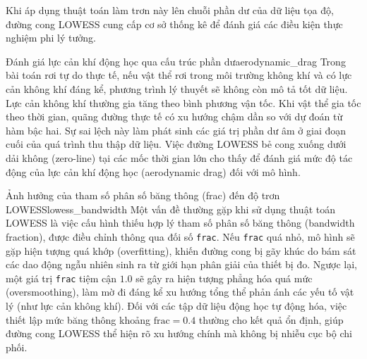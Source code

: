 Khi áp dụng thuật toán làm trơn này lên chuỗi phần dư của dữ liệu tọa độ, đường cong LOWESS cung cấp cơ sở thống kê để đánh giá các điều kiện thực nghiệm phi lý tưởng.

\begin{physcore}{Đánh giá lực cản khí động học qua cấu trúc phần dư}{aerodynamic_drag}
Trong bài toán rơi tự do thực tế, nếu vật thể rơi trong môi trường không khí và có lực cản không khí đáng kể, phương trình lý thuyết sẽ không còn mô tả tốt dữ liệu. Lực cản không khí thường gia tăng theo bình phương vận tốc. Khi vật thể gia tốc theo thời gian, quãng đường thực tế có xu hướng chậm dần so với dự đoán từ hàm bậc hai. Sự sai lệch này làm phát sinh các giá trị phần dư âm ở giai đoạn cuối của quá trình thu thập dữ liệu. Việc đường LOWESS bẻ cong xuống dưới dải không (zero-line) tại các mốc thời gian lớn cho thấy để đánh giá mức độ tác động của lực cản khí động học (aerodynamic drag) đối với mô hình.
\end{physcore}

\begin{pitfall}{Ảnh hưởng của tham số phân số băng thông (frac) đến độ trơn LOWESS}{lowess_bandwidth}
Một vấn đề thường gặp khi sử dụng thuật toán LOWESS là việc cấu hình thiếu hợp lý tham số phân số băng thông (bandwidth fraction), được điều chỉnh thông qua đối số \texttt{frac}. Nếu \texttt{frac} quá nhỏ, mô hình sẽ gặp hiện tượng quá khớp (overfitting), khiến đường cong bị gãy khúc do bám sát các dao động ngẫu nhiên sinh ra từ giới hạn phân giải của thiết bị đo. Ngược lại, một giá trị \texttt{frac} tiệm cận $1.0$ sẽ gây ra hiện tượng phẳng hóa quá mức (oversmoothing), làm mờ đi đáng kể xu hướng tổng thể phản ánh các yếu tố vật lý (như lực cản không khí). Đối với các tập dữ liệu động học tự động hóa, việc thiết lập mức băng thông khoảng $\text{frac}=0.4$ thường cho kết quả ổn định, giúp đường cong LOWESS thể hiện rõ xu hướng chính mà không bị nhiễu cục bộ chi phối.
\end{pitfall}